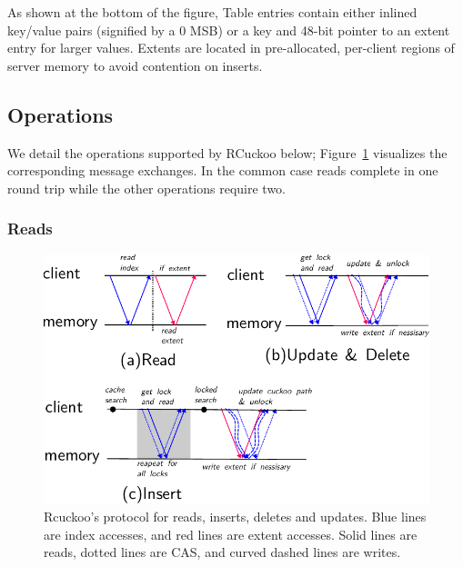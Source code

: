 
As shown at the bottom of the figure, Table entries contain either
inlined key/value pairs (signified by a 0 MSB) or a key and 48-bit
pointer to an extent entry for larger values.
Extents are located in pre-allocated, per-client regions of server
memory to avoid contention on inserts.





\subsection{Operations}

We detail the operations supported by RCuckoo below;
Figure~\ref{fig:message_diagram} visualizes the corresponding message
exchanges. In the common case reads complete in one round trip while
the other operations require two.




\subsubsection{Reads} 
\label{sec:reading}

\begin{figure}[t]
\includegraphics[width=0.99\linewidth]{fig/message_diagram.pdf}
\caption{Rcuckoo's protocol for reads, inserts, deletes and
updates. Blue lines are index accesses, and red lines are
extent accesses. Solid lines are reads, dotted lines are
CAS, and curved dashed lines are writes.}
\label{fig:message_diagram}
\end{figure}

